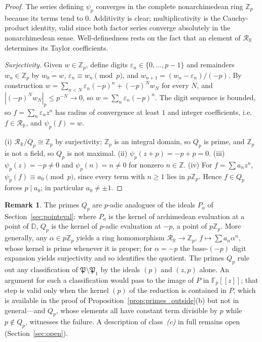 \documentclass[12pt]{amsart}
\theoremstyle{definition}
\newtheorem{remark}[theorem]{Remark}
\newcommand{\D}{\mathbb{D}}
\newcommand{\Z}{\mathbb{Z}}
\newcommand{\abs}[1]{\left|#1\right|}
\newcommand{\mRR}{\mathcal{R}_{\mathbb{R}}}
\begin{document}
\begin{proof}
The series defining $\psi_p$ converges in the complete nonarchimedean
ring $\Z_p$ because its terms tend to $0$.  Additivity is clear;
multiplicativity is the Cauchy-product identity, valid since both factor
series converge absolutely in the nonarchimedean sense.  Well-definedness
rests on the fact that an element of $\mRR$ determines its Taylor
coefficients.

\emph{Surjectivity.}  Given $w \in \Z_p$, define digits $\varepsilon_n
\in \{0, \ldots, p-1\}$ and remainders $w_n \in \Z_p$ by $w_0 = w$,
$\varepsilon_n \equiv w_n \pmod{p}$, and $w_{n+1} = (w_n -
\varepsilon_n)/(-p)$.  By construction $w = \sum_{n < N} \varepsilon_n
(-p)^n + (-p)^N w_N$ for every $N$, and $\abs{(-p)^N w_N}_p \leq p^{-N}
\to 0$, so $w = \sum_n \varepsilon_n (-p)^n$.  The digit sequence is
bounded, so $f = \sum_n \varepsilon_n z^n$ has radius of convergence at
least $1$ and integer coefficients, i.e.\ $f \in \mRR$, and $\psi_p(f) =
w$.

(i) $\mRR / Q_p \cong \Z_p$ by surjectivity; $\Z_p$ is an integral
domain, so $Q_p$ is prime, and $\Z_p$ is not a field, so $Q_p$ is not
maximal.  (ii) $\psi_p(z + p) = -p + p = 0$.  (iii) $\psi_p(z) = -p \neq
0$ and $\psi_p(n) = n \neq 0$ for nonzero $n \in \Z$.  (iv) For $f =
\sum a_n z^n$, $\psi_p(f) \equiv a_0 \pmod{p}$, since every term with
$n \geq 1$ lies in $p\Z_p$.  Hence $f \in Q_p$ forces $p \mid a_0$; in
particular $a_0 \neq \pm 1$.
\end{proof}

\begin{remark}
\label{rem:padic}
The primes $Q_p$ are $p$-adic analogues of the ideals $P_a$ of
Section~\ref{sec:pointeval}: where $P_a$ is the kernel of
archimedean evaluation at a point of $\D$, $Q_p$ is the kernel of
$p$-adic evaluation at $-p$, a point of $p\Z_p$.  More generally, any
$\alpha \in p\Z_p$ yields a ring homomorphism $\mRR \to \Z_p$, $f
\mapsto \sum a_n \alpha^n$, whose kernel is prime whenever it is proper;
for $\alpha = -p$ the base-$(-p)$ digit expansion yields surjectivity and
so identifies the quotient.  The primes $Q_p$ rule out any classification
of $\mathfrak{P} \setminus \mathfrak{P}_1$ by the ideals $(p)$ and
$(z,p)$ alone.  An argument for such a classification would pass to the
image of $P$ in $\mathbb{F}_p[[z]]$; that step is valid only when the
kernel $(p)$ of the reduction is contained in $P$, which is available in
the proof of Proposition~\ref{prop:primes_outside}(b) but not in
general---and $Q_p$, whose elements all have constant term divisible by
$p$ while $p \notin Q_p$, witnesses the failure.  A description of
class~\emph{(c)} in full remains open (Section~\ref{sec:open}).
\end{remark}
\end{document}
